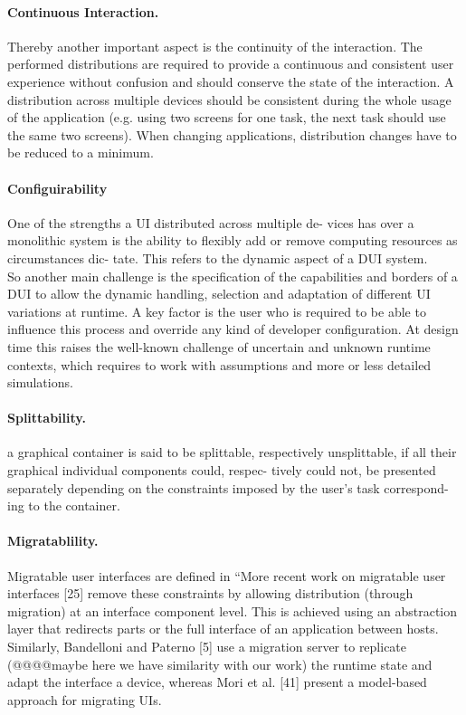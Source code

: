 \paragraph{Continuous Interaction.}
\cite{blumendorf2011distributed}
Thereby another important aspect is the continuity of the interaction. The
performed distributions are required to provide a continuous and consistent user
experience without confusion and should conserve the state of the interaction. A
distribution across multiple devices should be consistent during the whole usage
of the application (e.g. using two screens for one task, the next task should use the same two screens). When changing applications, distribution changes have to be reduced to a minimum. \\

\paragraph{Configuirability} 
\cite{chen2011distributed} One of the strengths a UI distributed across multiple
de- vices has over a monolithic system is the ability to flexibly add or remove
computing resources as circumstances dic- tate. This refers to the dynamic
aspect of a DUI system.\\ 
\cite{blumendorf2011distributed}
 So another main challenge is the specification of the capabilities and borders
of a DUI to allow the dynamic handling, selection and adaptation of different UI
variations at runtime. A key factor is the user who is required to be able to
influence this process and override any kind of developer configuration. At design time this raises the well-known challenge of uncertain and unknown runtime contexts, which requires to work with assumptions and more or less detailed simulations.\\

\paragraph{Splittability.}
\cite{demeure20084c} a graphical container is said to be splittable, respectively
 unsplittable, if all their graphical individual components could, respec-
 tively could not, be presented separately depending on the constraints imposed
 by the user’s task correspond- ing to the container.\\
 
\paragraph{Migratablility.}
Migratable user interfaces are defined in \cite{elmqvist2011distributed} ``More recent work on migratable user interfaces
[25] remove these constraints by allowing distribution (through migration) at an
interface component level. This is achieved using an abstraction layer that
redirects parts or the full interface of an application between hosts.
Similarly, Bandelloni and Paterno [5] use a migration server to replicate
(@@@@maybe here we have similarity with our work) the runtime state and adapt
the interface a device, whereas Mori et al.
[41] present a model-based approach for migrating UIs.


